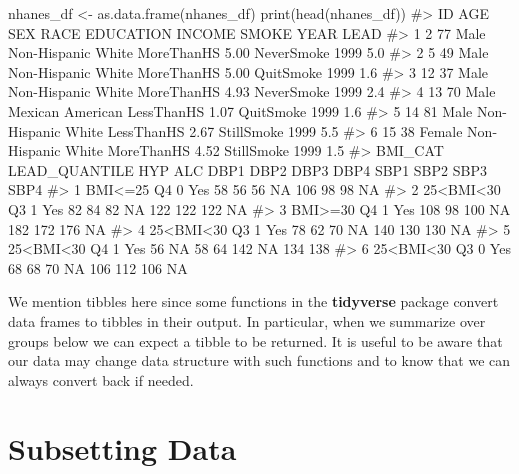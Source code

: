 \documentclass[
  letterpaper,
]{krantz}
\makeatletter
\newenvironment{Shaded}{\begin{snugshade}}{\end{snugshade}}
\newcommand{\CommentTok}[1]{\textcolor[rgb]{0.37,0.37,0.37}{#1}}
\newcommand{\FunctionTok}[1]{\textcolor[rgb]{0.28,0.35,0.67}{#1}}
\newcommand{\NormalTok}[1]{\textcolor[rgb]{0.00,0.23,0.31}{#1}}
\newcommand{\OtherTok}[1]{\textcolor[rgb]{0.00,0.23,0.31}{#1}}
\newenvironment{kframe}{%
\medskip{}
\setlength{\fboxsep}{.8em}
 \def\at@end@of@kframe{}%
 \ifinner\ifhmode%
  \def\at@end@of@kframe{\end{minipage}}%
  \begin{minipage}{\columnwidth}%
 \fi\fi%
 \def\FrameCommand##1{\hskip\@totalleftmargin \hskip-\fboxsep
 \colorbox{shadecolor}{##1}\hskip-\fboxsep
     \hskip-\linewidth \hskip-\@totalleftmargin \hskip\columnwidth}%
 \MakeFramed {\advance\hsize-\width
   \@totalleftmargin\z@ \linewidth\hsize
   \@setminipage}}%
 {\par\unskip\endMakeFramed%
 \at@end@of@kframe}
\renewenvironment{Shaded}{\begin{kframe}}{\end{kframe}}
\makeatother
\begin{document}
\begin{Shaded}
\begin{Highlighting}[]
\NormalTok{nhanes\_df }\OtherTok{\textless{}{-}} \FunctionTok{as.data.frame}\NormalTok{(nhanes\_df)}
\FunctionTok{print}\NormalTok{(}\FunctionTok{head}\NormalTok{(nhanes\_df))}
\CommentTok{\#\textgreater{}   ID AGE    SEX               RACE  EDUCATION INCOME      SMOKE YEAR LEAD}
\CommentTok{\#\textgreater{} 1  2  77   Male Non{-}Hispanic White MoreThanHS   5.00 NeverSmoke 1999  5.0}
\CommentTok{\#\textgreater{} 2  5  49   Male Non{-}Hispanic White MoreThanHS   5.00  QuitSmoke 1999  1.6}
\CommentTok{\#\textgreater{} 3 12  37   Male Non{-}Hispanic White MoreThanHS   4.93 NeverSmoke 1999  2.4}
\CommentTok{\#\textgreater{} 4 13  70   Male   Mexican American LessThanHS   1.07  QuitSmoke 1999  1.6}
\CommentTok{\#\textgreater{} 5 14  81   Male Non{-}Hispanic White LessThanHS   2.67 StillSmoke 1999  5.5}
\CommentTok{\#\textgreater{} 6 15  38 Female Non{-}Hispanic White MoreThanHS   4.52 StillSmoke 1999  1.5}
\CommentTok{\#\textgreater{}     BMI\_CAT LEAD\_QUANTILE HYP ALC DBP1 DBP2 DBP3 DBP4 SBP1 SBP2 SBP3 SBP4}
\CommentTok{\#\textgreater{} 1   BMI\textless{}=25            Q4   0 Yes   58   56   56   NA  106   98   98   NA}
\CommentTok{\#\textgreater{} 2 25\textless{}BMI\textless{}30            Q3   1 Yes   82   84   82   NA  122  122  122   NA}
\CommentTok{\#\textgreater{} 3   BMI\textgreater{}=30            Q4   1 Yes  108   98  100   NA  182  172  176   NA}
\CommentTok{\#\textgreater{} 4 25\textless{}BMI\textless{}30            Q3   1 Yes   78   62   70   NA  140  130  130   NA}
\CommentTok{\#\textgreater{} 5 25\textless{}BMI\textless{}30            Q4   1 Yes   56   NA   58   64  142   NA  134  138}
\CommentTok{\#\textgreater{} 6 25\textless{}BMI\textless{}30            Q3   0 Yes   68   68   70   NA  106  112  106   NA}
\end{Highlighting}
\end{Shaded}

We mention tibbles here since some functions in the \textbf{tidyverse}
package convert data frames to tibbles in their output. In particular,
when we summarize over groups below we can expect a tibble to be
returned. It is useful to be aware that our data may change data
structure with such functions and to know that we can always convert
back if needed.

\hypertarget{subsetting-data}{%
\section{Subsetting Data}\label{subsetting-data}}
\end{document}
